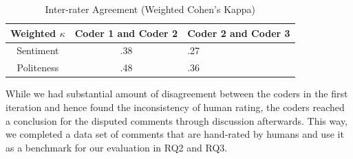 \vspace{3mm}
\noindent{}
\vspace{3mm}


\begin{table}
\centering
\caption{Inter-rater Agreement (Weighted Cohen's Kappa)}
  \label{interrater}
  \begin{tabular}{|c|c|l|}
    \toprule
    Weighted $\kappa$ & Coder 1 and Coder 2 &  Coder 2 and  Coder 3\\
    \midrule
    Sentiment & .38 & .27 \\
    \hline
    Politeness & .48 & .36\\
  \bottomrule
\end{tabular}
\end{table}

While we had substantial amount of disagreement 
between the coders in the first iteration 
and hence found the inconsistency of human rating, 
the coders reached a conclusion for the disputed comments 
through discussion afterwards. 
This way, we completed a data set of comments 
that are hand-rated by humans and 
use it as a benchmark for our evaluation in RQ2 and RQ3.

